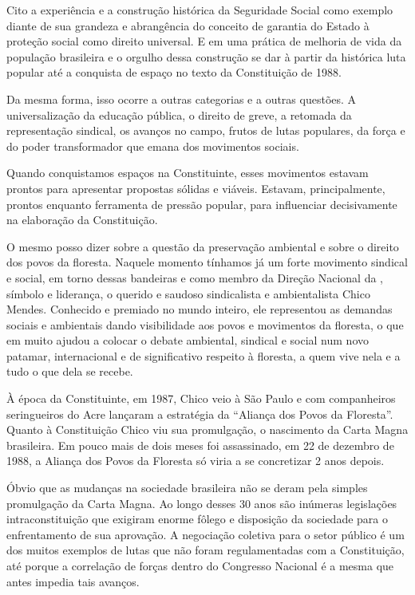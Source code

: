 Cito a experiência e a construção histórica da Seguridade Social como
exemplo diante de sua grandeza e abrangência do conceito de garantia do
Estado à proteção social como direito universal. E em uma prática de
melhoria de vida da população brasileira e o orgulho dessa construção se
dar à partir da histórica luta popular até a conquista de espaço no
texto da Constituição de 1988.

Da mesma forma, isso ocorre a outras categorias e a outras questões. A
universalização da educação pública, o direito de greve, a retomada da
representação sindical, os avanços no campo, frutos de lutas populares,
da força e do poder transformador que emana dos movimentos sociais.

Quando conquistamos espaços na Constituinte, esses movimentos estavam
prontos para apresentar propostas sólidas e viáveis. Estavam,
principalmente, prontos enquanto ferramenta de pressão popular, para
influenciar decisivamente na elaboração da Constituição.

O mesmo posso dizer sobre a questão da preservação ambiental e sobre o
direito dos povos da floresta. Naquele momento tínhamos já um forte
movimento sindical e social, em torno dessas bandeiras e como membro da
Direção Nacional da , símbolo e liderança, o querido e saudoso
sindicalista e ambientalista Chico Mendes. Conhecido e premiado no mundo
inteiro, ele representou as demandas sociais e ambientais dando
visibilidade aos povos e movimentos da floresta, o que em muito ajudou a
colocar o debate ambiental, sindical e social num novo patamar,
internacional e de significativo respeito à floresta, a quem vive nela e
a tudo o que dela se recebe.

À época da Constituinte, em 1987, Chico veio à São Paulo e com
companheiros seringueiros do Acre lançaram a estratégia da ``Aliança dos
Povos da Floresta''. Quanto à Constituição Chico viu sua promulgação, o
nascimento da Carta Magna brasileira. Em pouco mais de dois meses foi
assassinado, em 22 de dezembro de 1988, a Aliança dos Povos da Floresta
só viria a se concretizar 2 anos depois.

Óbvio que as mudanças na sociedade brasileira não se deram pela simples
promulgação da Carta Magna. Ao longo desses 30 anos são inúmeras
legislações intraconstituição que exigiram enorme fôlego e disposição
da sociedade para o enfrentamento de sua aprovação. A negociação
coletiva para o setor público é um dos muitos exemplos de lutas que não
foram regulamentadas com a Constituição, até porque a correlação de
forças dentro do Congresso Nacional é a mesma que antes impedia tais
avanços.

